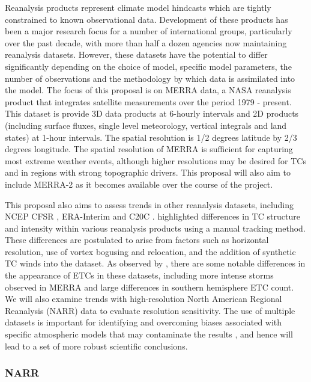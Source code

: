 \documentclass[11pt]{article}
\begin{document}
Reanalysis products represent climate model hindcasts which are tightly constrained to known observational data.  Development of these products has been a major research focus for a number of international groups, particularly over the past decade, with more than half a dozen agencies now maintaining reanalysis datasets.  However, these datasets have the potential to differ significantly depending on the choice of model, specific model parameters, the number of observations and the methodology by which data is assimilated into the model.  The focus of this proposal is on MERRA \citep{rienecker2011merra} data, a NASA reanalysis product that integrates satellite measurements over the period 1979 - present.  This dataset is provide 3D data products at 6-hourly intervals and 2D products (including surface fluxes, single level meteorology, vertical integrals and land states) at 1-hour intervals.  The spatial resolution is 1/2 degrees latitude by 2/3 degrees longitude.  The spatial resolution of MERRA is sufficient for capturing most extreme weather events, although higher resolutions may be desired for TCs and in regions with strong topographic drivers.  This proposal will also aim to include MERRA-2 as it becomes available over the course of the project.

This proposal also aims to assess trends in other reanalysis datasets, including NCEP CFSR \citep{saha2010ncep}, ERA-Interim \citep{simmons2007era} and C20C \citep{compo2011twentieth}. \citet{Schenkel2012} highlighted differences in TC structure and intensity within various reanalysis products using a manual tracking method. These differences are postulated to arise from factors such as horizontal resolution, use of vortex bogusing and relocation, and the addition of synthetic TC winds into the dataset. As observed by \cite{hodges2011comparison}, there are some notable differences in the appearance of ETCs in these datasets, including more intense storms observed in MERRA and large differences in southern hemisphere ETC count.  We will also examine trends with high-resolution North American Regional Reanalysis (NARR) data to evaluate resolution sensitivity.  The use of multiple datasets is important for identifying and overcoming biases associated with specific atmospheric models that may contaminate the results \citep{jun2008spatial}, and hence will lead to a set of more robust scientific conclusions.

\subsubsection{NARR} \label{sec:NARR}
\end{document}
